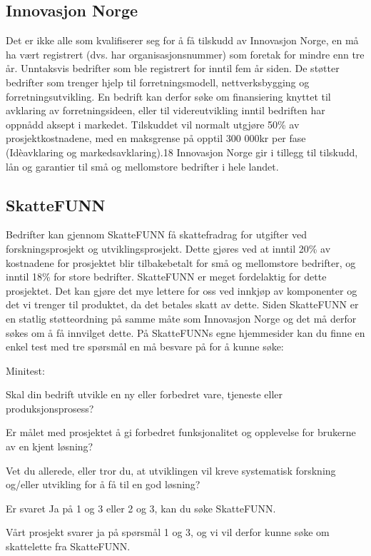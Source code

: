 \subsection{Innovasjon Norge}
Det er ikke alle som kvalifiserer seg for å få tilskudd av Innovasjon Norge, en må ha vært registrert (dvs. har organisasjonsnummer) som foretak for mindre enn tre år. Unntaksvis bedrifter som ble registrert for inntil fem år siden. 
De støtter bedrifter som trenger hjelp til forretningsmodell, nettverksbygging og forretningsutvikling. En bedrift kan derfor søke om finansiering knyttet til avklaring av forretningsideen, eller til videreutvikling inntil bedriften har oppnådd aksept i markedet. 
Tilskuddet vil normalt utgjøre 50\% av prosjektkostnadene, med en maksgrense på opptil 300 000kr per fase (Idèavklaring og markedsavklaring).18  
Innovasjon Norge gir i tillegg til tilskudd, lån og garantier til små og mellomstore bedrifter i hele landet.

\subsection{SkatteFUNN}
Bedrifter kan gjennom SkatteFUNN få skattefradrag for utgifter ved forskningsprosjekt og utviklingsprosjekt. Dette gjøres ved at inntil 20\% av kostnadene for prosjektet blir tilbakebetalt for små og mellomstore bedrifter, og inntil 18\% for store bedrifter. 
SkatteFUNN er meget fordelaktig for dette prosjektet. Det kan gjøre det mye lettere for oss ved innkjøp av komponenter og det vi trenger til produktet, da det betales skatt av dette. Siden SkatteFUNN er en statlig støtteordning på samme måte som Innovasjon Norge og det må derfor søkes om å få innvilget dette. På SkatteFUNNs egne hjemmesider kan du finne en enkel test med tre spørsmål en må besvare på for å kunne søke: 

Minitest:
 
Skal din bedrift utvikle en ny eller forbedret vare, tjeneste eller produksjonsprosess? 

Er målet med prosjektet å gi forbedret funksjonalitet og opplevelse for brukerne av en kjent løsning? 

Vet du allerede, eller tror du, at utviklingen vil kreve systematisk forskning og/eller utvikling for å få til en god løsning? 

Er svaret Ja på 1 og 3 eller 2 og 3, kan du søke SkatteFUNN.

Vårt prosjekt svarer ja på spørsmål 1 og 3, og vi vil derfor kunne søke om skattelette fra SkatteFUNN.  

